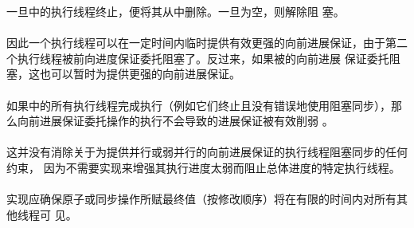 一旦中的执行线程终止，便将其从中删除。一旦为空，则解除阻
塞。

\paragraph{} %
\begin{note}
  因此一个执行线程可以在一定时间内临时提供有效更强的向前进展保证，由于第二
  个执行线程被前向进度保证委托阻塞了。反过来，如果被的向前进展
  保证委托阻塞，这也可以暂时为提供更强的向前进展保证。
\end{note}

\paragraph{} %
\begin{note}
  如果中的所有执行线程完成执行（例如它们终止且没有错误地使用阻塞同步），那
  么向前进展保证委托操作的执行不会导致的进展保证被有效削弱 。
\end{note}

\paragraph{} %
\begin{note}
  这并没有消除关于为提供并行或弱并行的向前进展保证的执行线程阻塞同步的任何约束，
  因为不需要实现来增强其执行进度太弱而阻止总体进度的特定执行线程。
\end{note}

\paragraph{} %
实现应确保原子或同步操作所赋最终值（按修改顺序）将在有限的时间内对所有其他线程可
见。
